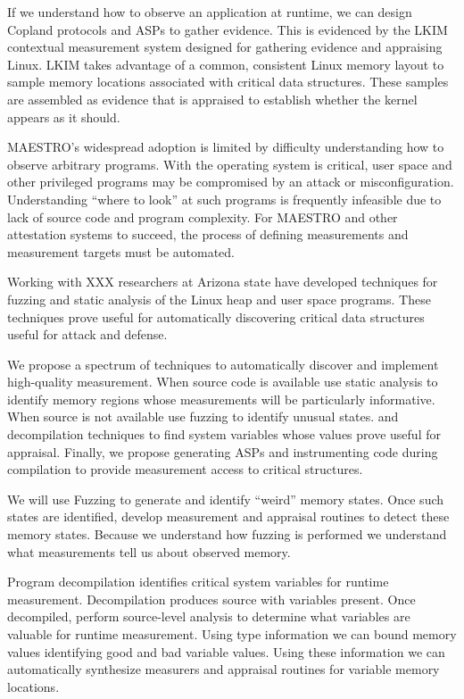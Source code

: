 \documentclass[runningheads]{llncs}
\begin{document}
If we understand how to observe an application at runtime, we can
design Copland protocols and ASPs to gather evidence.  This is
evidenced by the LKIM~\cite{Loscocco:07:Linux-kernel-in} contextual
measurement system designed for gathering evidence and appraising
Linux.  LKIM takes advantage of a common, consistent Linux memory
layout to sample memory locations associated with critical data
structures.  These samples are assembled as evidence that is appraised
to establish whether the kernel appears as it should.

MAESTRO's widespread adoption is limited by difficulty understanding
how to observe arbitrary programs.  With the operating system is
critical, user space and other privileged programs may be compromised
by an attack or misconfiguration.  Understanding ``where to look'' at
such programs is frequently infeasible due to lack of source
code and program complexity.  For MAESTRO and other attestation
systems to succeed, the process of defining measurements and
measurement targets must be automated.

Working with XXX researchers at Arizona state have developed
techniques for fuzzing and static analysis of the Linux heap and user
space programs.  These techniques prove useful for automatically
discovering critical data structures useful for attack and defense.

We propose a spectrum of techniques to automatically discover and
implement high-quality measurement.  When source code is available use
static analysis to identify memory regions whose measurements will be
particularly informative.  When source is not available use fuzzing to
identify unusual states. and decompilation techniques to find system
variables whose values prove useful for appraisal.  Finally, we
propose generating ASPs and instrumenting code during compilation to
provide measurement access to critical structures.

We will use Fuzzing to generate and identify ``weird'' memory states.
Once such states are identified, develop measurement and appraisal
routines to detect these memory states.  Because we understand how
fuzzing is performed we understand what measurements tell us about
observed memory.

Program decompilation identifies critical system variables for runtime
measurement.  Decompilation produces source with variables present.
Once decompiled, perform source-level analysis to determine what
variables are valuable for runtime measurement.  Using type
information we can bound memory values identifying good and bad
variable values.  Using these information we can automatically
synthesize measurers and appraisal routines for variable memory
locations.
\end{document}
